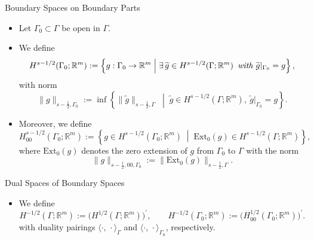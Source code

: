 \documentclass[10pt,aspectratio=169]{beamer}
\def\R{{\mathbb R}}
\begin{document}
\begin{frame}{Boundary Spaces on Boundary Parts}
	\begin{itemize}
		\item Let $\Gamma_0\subset\Gamma$ be open in $\Gamma$.
		\item We define
		      \begin{equation*}
			      H^{s-1/2}(\Gamma_0;\R^m)
			      :=
			      \left\{g:\Gamma_0\to \R^m\;\middle|\;\exists\,\widetilde g\in H^{s-1/2}(\Gamma;\R^m)\text{\em\enspace with }\widetilde g|_{\Gamma_0}=g\right\},
		      \end{equation*}
		      with norm
		      \begin{equation*}
			      \|g\|_{s-\tfrac12,\Gamma_0}
			      :=
			      \inf\left\{
			      \|\widetilde g\|_{s-\tfrac12,\Gamma}
			      \;\middle|\;
			      \widetilde g\in H^{s-1/2}(\Gamma;\R^m),\ \widetilde g|_{\Gamma_0}=g
			      \right\}.
		      \end{equation*}
		\item Moreover, we define
		      \begin{equation*}
			      H^{s-1/2}_{00}(\Gamma_0;\R^m)
			      :=
			      \left\{g\in H^{s-1/2}(\Gamma_0;\R^m)\;\middle|\;\mathrm{Ext}_0(g)\in H^{s-1/2}(\Gamma;\R^m)\right\},
		      \end{equation*}
		      where $\mathrm{Ext}_0(g)$ denotes the zero extension of $g$ from $\Gamma_0$ to $\Gamma$ with the norm
		      \begin{equation*}
			      \|g\|_{s-\tfrac12,00,\Gamma_0}:=\|\mathrm{Ext}_0(g)\|_{s-\tfrac12,\Gamma}.
		      \end{equation*}
	\end{itemize}
\end{frame}

\begin{frame}{Dual Spaces of Boundary Spaces}
	\begin{itemize}
		\item We define
		      \begin{equation*}
			      H^{-1/2}(\Gamma;\R^m):=\big(H^{1/2}(\Gamma;\R^m)\big)^\prime,\qquad  H^{-1/2}(\Gamma_0;\R^m):=\big(H^{1/2}_{00}(\Gamma_0;\R^m)\big)^\prime.
		      \end{equation*}
		      with duality pairings $\langle\cdot,\,\cdot\rangle_\Gamma$ and $\langle\cdot,\,\cdot\rangle_{\Gamma_0}$, respectively.
	\end{itemize}
\end{frame}
\end{document}
